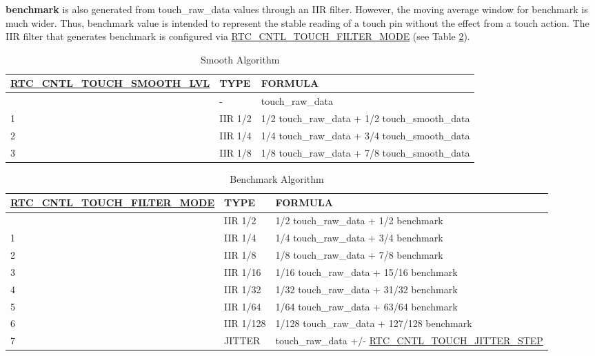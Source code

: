 \documentclass[main\_\_EN.tex]{subfiles}
\begin{document}
\textbf{benchmark} is also generated from touch\_raw\_data values through an IIR filter. However, the moving average window for benchmark is much wider. Thus, benchmark value is intended to represent the stable reading of a touch pin without the effect from a touch action. The IIR filter that generates benchmark is configured via \hyperref[fielddesc:RTCCNTLTOUCHFILTERMODE]{RTC\_CNTL\_TOUCH\_FILTER\_MODE} (see Table \ref{table:baselinecal}).

\begin{longtable}[c]{|p{5.5 cm}|p{1.5cm}|p{7.5cm}|}
    \caption{Smooth Algorithm}
    \label{table:smooth cal}\\
    \hline
    \rowcolor{lightgray}
    \textbf{\hyperref[fielddesc:RTCCNTLTOUCHSMOOTHLVL]{RTC\_CNTL\_TOUCH\_SMOOTH\_LVL}} & \textbf{TYPE} &\textbf{FORMULA}\\
    \hline
    \endhead
    \endfoot
    \endlastfoot
    0  & - & touch\_raw\_data  \\\hline
    1  & IIR 1/2 & 1/2 touch\_raw\_data + 1/2 touch\_smooth\_data \\\hline
    2  & IIR 1/4 & 1/4 touch\_raw\_data + 3/4 touch\_smooth\_data \\\hline
    3  & IIR 1/8 & 1/8 touch\_raw\_data + 7/8 touch\_smooth\_data \\\hline
\end{longtable}
\begin{longtable}[c]{|p{5.5 cm}|p{1.5cm}|p{8.5cm}|}
    \caption{Benchmark Algorithm}
    \label{table:baselinecal}\\
    \hline
    \rowcolor{lightgray}
    \textbf{\hyperref[fielddesc:RTCCNTLTOUCHFILTERMODE]{RTC\_CNTL\_TOUCH\_FILTER\_MODE}} & \textbf{TYPE} & \textbf{FORMULA}\\
    \hline
    \endhead
    \endfoot
    \endlastfoot
    0  &  IIR 1/2 & 1/2 touch\_raw\_data + 1/2 benchmark \\\hline
    1  &  IIR 1/4 & 1/4 touch\_raw\_data + 3/4 benchmark \\\hline
    2  &  IIR 1/8 & 1/8 touch\_raw\_data + 7/8 benchmark \\\hline
    3  &  IIR 1/16 & 1/16 touch\_raw\_data + 15/16 benchmark \\\hline
    4  &  IIR 1/32 & 1/32 touch\_raw\_data + 31/32 benchmark \\\hline
    5  &  IIR 1/64 & 1/64 touch\_raw\_data + 63/64 benchmark \\\hline
    6  &  IIR 1/128 & 1/128 touch\_raw\_data + 127/128 benchmark \\\hline
    7  &  JITTER & touch\_raw\_data +/- \hyperref[fielddesc:RTCCNTLTOUCHJITTERSTEP]{RTC\_CNTL\_TOUCH\_JITTER\_STEP} \\\hline
\end{longtable}
\end{document}

